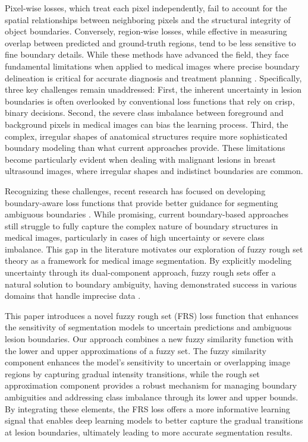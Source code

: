 \documentclass[review]{elsarticle}
\begin{document}
Pixel-wise losses, which treat each pixel independently, fail to account for the spatial relationships between neighboring pixels and the structural integrity of object boundaries. Conversely, region-wise losses, while effective in measuring overlap between predicted and ground-truth regions, tend to be less sensitive to fine boundary details. While these methods have advanced the field, they face fundamental limitations when applied to medical images where precise boundary delineation is critical for accurate diagnosis and treatment planning \cite{Chen2023}. Specifically, three key challenges remain unaddressed: First, the inherent uncertainty in lesion boundaries is often overlooked by conventional loss functions that rely on crisp, binary decisions. Second, the severe class imbalance between foreground and background pixels in medical images can bias the learning process. Third, the complex, irregular shapes of anatomical structures require more sophisticated boundary modeling than what current approaches provide. These limitations become particularly evident when dealing with malignant lesions in breast ultrasound images, where irregular shapes and indistinct boundaries are common.

Recognizing these challenges, recent research has focused on developing boundary-aware loss functions that provide better guidance for segmenting ambiguous boundaries \cite{Du2023, Lin2024, Sun2023}. While promising, current boundary-based approaches still struggle to fully capture the complex nature of boundary structures in medical images, particularly in cases of high uncertainty or severe class imbalance. This gap in the literature motivates our exploration of fuzzy rough set theory as a framework for medical image segmentation. By explicitly modeling uncertainty through its dual-component approach, fuzzy rough sets offer a natural solution to boundary ambiguity, having demonstrated success in various domains that handle imprecise data \cite{Hong2019, AFFONSO2015}.

This paper introduces a novel fuzzy rough set (FRS) loss function that enhances the sensitivity of segmentation models to uncertain predictions and ambiguous lesion boundaries. Our approach combines a new fuzzy similarity function with the lower and upper approximations of a fuzzy set. The fuzzy similarity component enhances the model's sensitivity to uncertain or overlapping image regions by capturing gradual intensity transitions, while the rough set approximation component provides a robust mechanism for managing boundary ambiguities and addressing class imbalance through its lower and upper bounds. By integrating these elements, the FRS loss offers a more informative learning signal that enables deep learning models to better capture the gradual transitions at lesion boundaries, ultimately leading to more accurate segmentation results.
\end{document}
